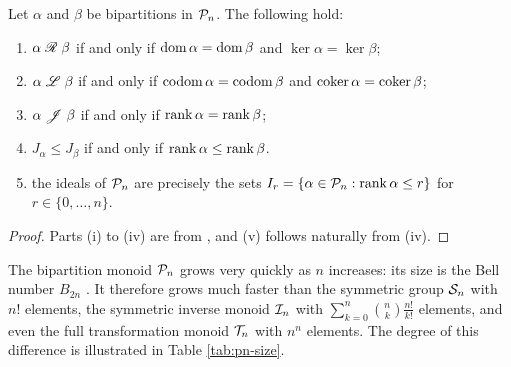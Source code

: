 \begin{proposition}
  \label{prop:bipartition-greens}
  Let $\alpha$ and $\beta$ be bipartitions in $\mathcal{P}_n$.  The following hold:
  \begin{enumerate}[\rm(i)]
  \item $\alpha \mathrel{\mathscr{R}} \beta$ if and only if $\operatorname{dom} \alpha = \operatorname{dom} \beta$ and
    $\ker \alpha = \ker \beta$;
  \item $\alpha \mathrel{\mathscr{L}} \beta$ if and only if $\operatorname{codom} \alpha = \operatorname{codom} \beta$ and
    $\operatorname{coker} \alpha = \operatorname{coker} \beta$;
  \item $\alpha \mathrel{\mathscr{J}} \beta$ if and only if $\operatorname{rank} \alpha = \operatorname{rank} \beta$;
  \item $J_\alpha \leq J_\beta$ if and only if $\operatorname{rank} \alpha \leq \operatorname{rank} \beta$.
  \item the ideals of $\mathcal{P}_n$ are precisely the sets
    $I_r=\{\alpha \in \mathcal{P}_n : \operatorname{rank} \alpha \leq r\}$ for
    $r \in \{0, \ldots, n\}$.
  \end{enumerate}
  \begin{proof}
    Parts (i) to (iv) are from \cite{fitzgerald_2011}, and (v) follows naturally
    from (iv).
  \end{proof}
\end{proposition}

The bipartition monoid $\mathcal{P}_n$ grows very quickly as $n$ increases: its size is
the Bell number $B_{2n}$ .
It therefore grows much faster than the symmetric group $\mathcal{S}_n$ with $n!$
elements, the symmetric inverse monoid $\mathcal{I}_n$ with
$\sum_{k=0}^n \binom{n}{k} \frac{n!}{k!}$ elements, and even the full
transformation monoid $\mathcal{T}_n$ with $n^n$ elements.  The degree of this difference
is illustrated in Table \ref{tab:pn-size}.


